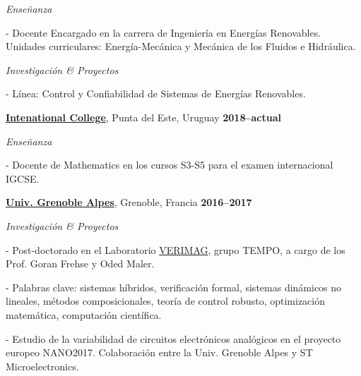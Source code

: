 \documentclass[10pt]{article}
\newenvironment{outerlist}[1][\enskip\textbullet]%
        {\begin{itemize}[#1]}{\end{itemize}%
         \vspace{-.6\baselineskip}}
\newenvironment{innerlist}[1][\enskip\textbullet]%
        {\begin{compactitem}[#1]}{\end{compactitem}}
\newcommand{\blankline}{\quad\pagebreak[2]}
\begin{document}
\begin{outerlist}
	\item[]\textit{Enseñanza}
	\begin{innerlist}
		\item[-] Docente Encargado en la carrera de Ingeniería en Energías Renovables. Unidades curriculares: Energía-Mecánica y Mecánica de los Fluidos e Hidr\'{a}ulica.
	\end{innerlist}
	\item[]\textit{Investigación \& Proyectos}
\begin{innerlist}
	\item[-] L\'{i}nea: Control y Confiabilidad de Sistemas de Energ\'{i}as Renovables.
\end{innerlist}
\end{outerlist}


\blankline

\href{https://ic.edu.uy/}{\textbf{Intenational College}}, Punta del Este, Uruguay
\hfill\textbf{2018--actual}

\begin{outerlist}
	\item[]\textit{Enseñanza}
	\begin{innerlist}
		\item[-] Docente de Mathematics en los cursos S3-S5 para el examen internacional IGCSE.
	\end{innerlist}
\end{outerlist}

\blankline


\href{http://www.ujf-grenoble.fr/}{\textbf{Univ. Grenoble Alpes}}, Grenoble, Francia
\hfill\textbf{2016--2017}

\begin{outerlist}
	\item[]\textit{Investigación \& Proyectos}
	\begin{innerlist}
		\item[-] Post-doctorado en el Laboratorio \href{http://www-verimag.imag.fr/?lang=en}{VERIMAG}, grupo TEMPO, a cargo de los Prof. Goran Frehse y Oded Maler.
		
		\item[-] Palabras clave: sistemas híbridos, verificación formal, sistemas dinámicos no lineales, métodos composicionales, teoría de control robusto, optimización matemática, computación científica.
	
		\item[-] Estudio de la variabilidad de circuitos electrónicos analógicos en el proyecto europeo NANO2017. Colaboración entre la Univ. Grenoble Alpes y ST Microelectronics.
	\end{innerlist}
\end{outerlist}
\end{document}
